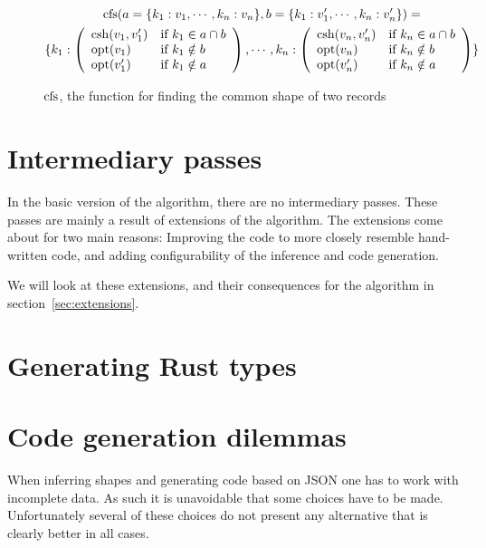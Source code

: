 \begin{figure}[ht!]
\begin{gather*}
\operatorname{cfs}(a = \{ k_1 : v_1, \cdots, k_n : v_n \}, b = \{ k_1 : v'_1, \cdots, k_n : v'_n \}) = \\
\{ k_1 : \left( \begin{array}{ll}
  \operatorname{csh}(v_1, v'_1) & \text{if } k_1 \in a \cap b \\
  \operatorname{opt}(v_1) & \text{if } k_1 \notin b \\
  \operatorname{opt}(v'_1) & \text{if } k_1 \notin a
\end{array}\right), \cdots, k_n : \left( \begin{array}{ll}
  \operatorname{csh}(v_n, v'_n) & \text{if } k_n \in a \cap b \\
  \operatorname{opt}(v_n) & \text{if } k_n \notin b \\
  \operatorname{opt}(v'_n) & \text{if } k_n \notin a
\end{array}\right) \}
\end{gather*}
\caption{$\operatorname{cfs}$, the function for finding the common shape of two records}
\label{fig:ufi}
\end{figure}

\section{Intermediary passes}

In the basic version of the algorithm, there are no intermediary passes. These passes are mainly a result of extensions of the algorithm. The extensions come about for two main reasons: Improving the code to more closely resemble hand-written code, and adding configurability of the inference and code generation.

We will look at these extensions, and their consequences for the algorithm in section~\ref{sec:extensions}.

\section{Generating Rust types}

\section{Code generation dilemmas}
\label{sec:design-considerations}

When inferring shapes and generating code based on JSON one has to work with incomplete data. As such it is unavoidable that some choices have to be made. Unfortunately several of these choices do not present any alternative that is clearly better in all cases.

